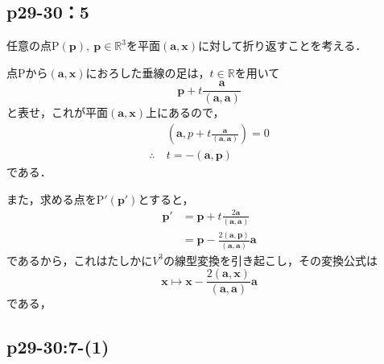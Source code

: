\documentclass[uplatex,dvipdfmx,a4paper,10pt,fleqn]{jsarticle}
\begin{document}
\subsection*{p29-30：5}

\begin{tleftbar}
    任意の点$\mathrm{P}(\bm{p}),~\bm{p} \in \mathbb{R}^3$を平面$(\bm{a},\bm{x})$に対して折り返すことを考える．

    点$\mathrm{P}$から$(\bm{a},\bm{x})$におろした垂線の足は，$t \in \mathbb{R}$を用いて
    \[
        \bm{p} + t \frac{\bm{a}}{(\bm{a},\bm{a})}
    \]
    と表せ，これが平面$(\bm{a},\bm{x})$上にあるので，
    \begin{align*} 
        & (\bm{a},p+t\frac{\bm{a}}{(\bm{a},\bm{a})})=0 \\
        \therefore ~ & t=- (\bm{a},\bm{p}) 
    \end{align*} 
    である．
    
    また，求める点を$\mathrm{P}' (\bm{p}')$とすると，
    \begin{align*}
        \bm{p}' &= \bm{p}+t \frac{2\bm{a}}{(\bm{a},\bm{a})} \\
        & = \bm{p}-\frac{2(\bm{a},\bm{p})}{(\bm{a},\bm{a})} \bm{a}
    \end{align*}
    であるから，これはたしかに$V^3$の線型変換を引き起こし，その変換公式は
    \[
        \bm{x} \mapsto \bm{x}-\frac{2(\bm{a},\bm{x})}{(\bm{a},\bm{a})} \bm{a}
    \]
    である，
\end{tleftbar}

\subsection*{p29-30:7-(1)}
\end{document}
